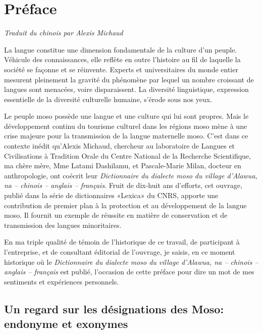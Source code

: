 \languefra

\chapter*{Préface}

{\raggedleft \em{Traduit du chinois par Alexis Michaud}\par}


La langue constitue une dimension fondamentale de la culture d’un peuple. Véhicule des connaissances, elle reflète en outre l’histoire au fil de laquelle la société se façonne et se réinvente. Experts et universitaires du monde entier mesurent pleinement la gravité du phénomène par lequel un nombre croissant de langues sont menacées, voire disparaissent. La diversité linguistique, expression essentielle de la diversité culturelle humaine, s'érode sous nos yeux.

Le peuple moso possède une langue et une culture qui lui sont propres. Mais le développement continu du tourisme culturel dans les régions moso mène à une crise majeure pour la transmission de la langue maternelle moso. C’est dans ce contexte inédit qu’Alexis Michaud, chercheur au laboratoire de Langues et Civilisations à Tradition Orale du Centre National de la Recherche Scientifique, ma chère mère, Mme Latami Dashilamu, et Pascale-Marie Milan, docteur en anthropologie, ont coécrit leur \emph{Dictionnaire du dialecte moso du village d'Alawua, na – chinois – anglais – français}. Fruit de dix-huit ans d’efforts, cet ouvrage, publié dans la série de dictionnaires «Lexica» du CNRS, apporte une contribution de premier plan à la protection et au développement de la langue moso. Il fournit un exemple de réussite en matière de conservation et de transmission des langues minoritaires.

En ma triple qualité de témoin de l’historique de ce travail, de participant à l’entreprise, et de consultant éditorial de l’ouvrage, je saisis, en ce moment historique où le \emph{Dictionnaire du dialecte moso du village d'Alawua, na – chinois – anglais – français} est publié, l’occasion de cette préface pour dire un mot de mes sentiments et expériences personnels.

\section*{Un regard sur les désignations des Moso: endonyme et exonymes}

